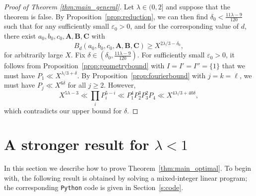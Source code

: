 \documentclass[a4paper,11pt,twoside,reqno]{amsart}
\def\Ab{\mathbf{A}}
\def\Bb{\mathbf{B}}
\def\Cb{\mathbf{C}}
\renewcommand{\ge}{\geqslant}
\theoremstyle{plain}
\theoremstyle{remark}
\numberwithin{prop}{section}
\numberwithin{equation}{section}
\begin{document}
\begin{proof}[Proof of Theorem \ref{thm:main_general}]
Let $\lambda\in (0,2]$ and suppose that the theorem is false.
By Proposition~\ref{prop:reduction}, we can then find $\delta_0<\frac{11\lambda-9}{120}$ such that for any sufficiently small $\varepsilon_0>0$,  and for the corresponding value of $d$, there exist $a_0,b_0,c_0,\Ab,\Bb,\Cb$ with
    \[B_d(a_0,b_0,c_0,\Ab,\Bb,\Cb) \ge X^{2\lambda/3-\delta_0},\]
    for arbitrarily large $X$. Fix $\delta \in (\delta_0,\frac{11\lambda-9}{120})$.
        For sufficiently small $\varepsilon_0>0$, it follows from 
        Proposition~\ref{prop:geometrybound} with $I=I'=I''=\{1\}$ that we must have $P_1 \ll X^{\lambda/3+\delta}$. By Proposition~\ref{prop:fourierbound} with $j=k=\ell$, we must have $P_j \ll X^{6\delta}$ for all $j \ge 2$. However,
    \begin{equation*}
        X^{5\lambda-3} \ll \prod_i P_i^{5-i} \ll P_1^4P_2^3P_3^2P_4 \ll X^{4\lambda/3+40\delta},
    \end{equation*}
    which contradicts our upper bound for $\delta$.
\end{proof}

\section{A stronger result for $\lambda<1$}

In this section we describe how to prove Theorem~\ref{thm:main_optimal}. To begin with,
the following result is obtained by solving a mixed-integer linear program; the corresponding \texttt{Python} code is given in Section~\ref{s:code}.
\end{document}
